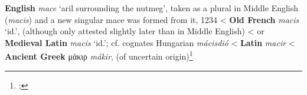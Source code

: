 \begin{etymology}\label{ety:mace}
\textbf{English} \textit{mace} `aril surrounding the nutmeg', taken as a plural in Middle English (\textit{macis}) and a new singular mace was formed from it, 1234
< \textbf{Old French} \textit{macis} `id.', (although only attested slightly later than in Middle English)
< or \textbf{Medieval Latin} \textit{macis} `id.'; cf. cognates Hungarian \textit{mácisdió}
< \textbf{Latin} \textit{macir}
< \textbf{Ancient Greek} {μάκιρ} \textit{mákir}, (of uncertain origin)\footnote{; }
\end{etymology}